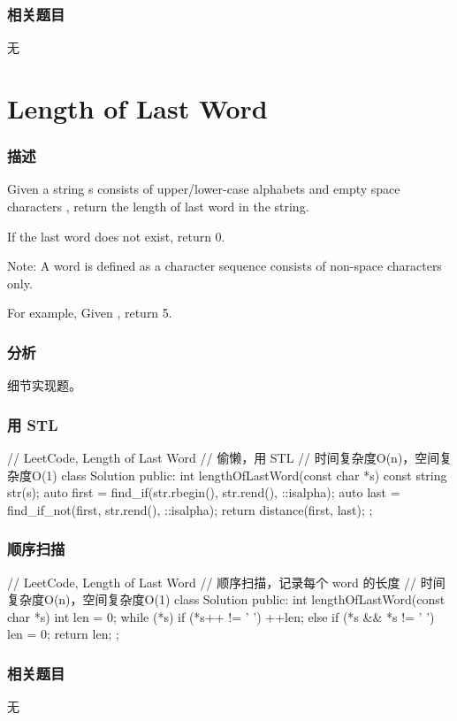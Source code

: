 \subsubsection{相关题目}
\begindot
\item 无
\myenddot


\section{Length of Last Word} %
\label{sec:length-of-last-word}


\subsubsection{描述}
Given a string s consists of upper/lower-case alphabets and empty space characters , return the length of last word in the string.

If the last word does not exist, return 0.

Note: A word is defined as a character sequence consists of non-space characters only.

For example, 
Given ,
return 5.


\subsubsection{分析}
细节实现题。


\subsubsection{用 STL}
\begin{Code}
// LeetCode, Length of Last Word
// 偷懒，用 STL
// 时间复杂度O(n)，空间复杂度O(1)
class Solution {
public:
    int lengthOfLastWord(const char *s) {
        const string str(s);
        auto first = find_if(str.rbegin(), str.rend(), ::isalpha);
        auto last = find_if_not(first, str.rend(), ::isalpha);
        return distance(first, last);
    }
};
\end{Code}


\subsubsection{顺序扫描}
\begin{Code}
// LeetCode, Length of Last Word
// 顺序扫描，记录每个 word 的长度
// 时间复杂度O(n)，空间复杂度O(1)
class Solution {
public:
    int lengthOfLastWord(const char *s) {
        int len = 0;
        while (*s) {
            if (*s++ != ' ')
                ++len;
            else if (*s && *s != ' ')
                len = 0;
        }
        return len;
    }
};
\end{Code}


\subsubsection{相关题目}
\begindot
\item 无
\myenddot
